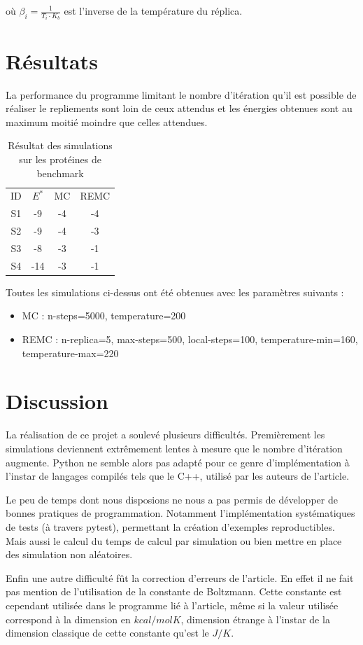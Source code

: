 où $\beta_i = \frac{1}{T_i \cdot K_b}$ est l'inverse de la température du réplica.

\section{Résultats}

La performance du programme limitant le nombre d'itération qu'il est possible de réaliser le repliements sont loin de ceux attendus et les énergies obtenues sont au maximum moitié moindre que celles attendues.

\begin{table}[H]
    \centering
    \begin{tabular}{c|c|c|c}
        ID & $E^*$ & MC & REMC \\
        S1 & -9 & -4 & -4\\
        S2 & -9 & -4 & -3\\
        S3 & -8 & -3 & -1\\
        S4 & -14 & -3 & -1
    \end{tabular}
    \caption{Résultat des simulations sur les protéines de benchmark}
    \label{tab:my_label}
\end{table}

Toutes les simulations ci-dessus ont été obtenues avec les paramètres suivants :
\begin{itemize}
    \item MC : n-steps=5000, temperature=200
    \item REMC : n-replica=5, max-steps=500, local-steps=100, temperature-min=160, temperature-max=220
\end{itemize}

\section{Discussion}

La réalisation de ce projet a soulevé plusieurs difficultés. Premièrement les simulations deviennent extrêmement lentes à mesure que le nombre d'itération augmente. Python ne semble alors pas adapté pour ce genre d'implémentation à l'instar de langages compilés tels que le C++, utilisé par les auteurs de l'article.

Le peu de temps dont nous disposions ne nous a pas permis de développer de bonnes pratiques de programmation. Notamment l'implémentation systématiques de tests (à travers pytest), permettant la création d'exemples reproductibles. Mais aussi le calcul du temps de calcul par simulation ou bien mettre en place des simulation non aléatoires.

Enfin une autre difficulté fût la correction d'erreurs de l'article. En effet il ne fait pas mention de l'utilisation de la constante de Boltzmann. Cette constante est cependant utilisée dans le programme lié à l'article, même si la valeur utilisée correspond à la dimension en $kcal/molK$, dimension étrange à l'instar de la dimension classique de cette constante qu'est le $J/K$.
